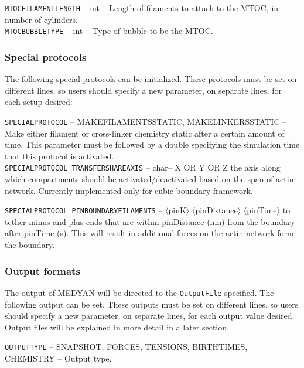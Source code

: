 \documentclass[11pt, oneside]{article}   	%
\begin{document}
  \noindent\texttt{MTOCFILAMENTLENGTH} -- int -- Length of filaments to attach to the MTOC, in number of cylinders.\\
    
  \noindent\texttt{MTOCBUBBLETYPE} -- int -- Type of bubble to be the MTOC. \\
\normalsize

\subsubsection{Special protocols}

The following special protocols can be initialized. These protocols must be set on different lines, so users should specify a new parameter, on separate lines, for each setup desired:\\

\small

\noindent\texttt{SPECIALPROTOCOL} -- MAKEFILAMENTSSTATIC, MAKELINKERSSTATIC -- Make either filament or cross-linker chemistry static after a certain amount of time. This parameter must be followed by a double specifying the simulation time that this protocol is activated.\\

\noindent  \texttt{SPECIALPROTOCOL TRANSFERSHAREAXIS} -- char-- X OR Y OR Z the axis along which compartments should be activated/deactivated based on the span of actin network. Currently implemented only for cubic boundary framework.

\noindent  \texttt{SPECIALPROTOCOL PINBOUNDARYFILAMENTS} -- $\langle$pinK$\rangle$ $\langle$pinDistance$\rangle$ $\langle$pinTime$\rangle$ to tether minus and plus ends that are within pinDistance (nm) from the boundary after pinTime (s). This will result in additional forces on the actin network form the boundary.

\subsubsection{Output formats}

The output of MEDYAN will be directed to the \texttt{OutputFile} specified. The following output can be set. These outputs must be set on different lines, so users should specify a new parameter, on separate lines, for each output value desired. Output files will be explained in more detail in a later section.\\

\small

  \noindent\texttt{OUTPUTTYPE} -- SNAPSHOT, FORCES, TENSIONS, BIRTHTIMES, CHEMISTRY -- Output type.\\
 
\end{document}
